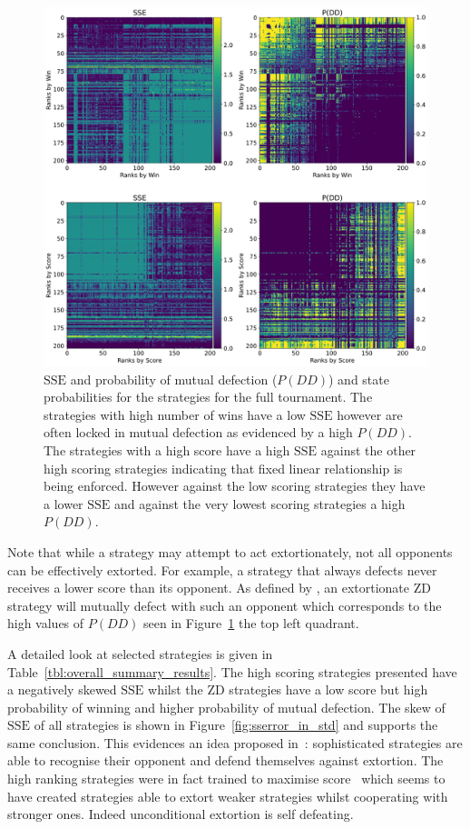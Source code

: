 \documentclass[a4paper]{article}
\newcommand{\SSe}{\text{SSE}}
\begin{document}
\begin{figure}[!htbp]
    \centering
    \includegraphics[width=.95\textwidth]{./assets/img/sse_chi_probabilities_in_full/main.pdf}
    \caption{\(\SSe\) and probability of mutual defection (\(P(DD)\)) and state probabilities for the strategies for
        the full tournament. The strategies with high number of wins
        have a low \(\SSe\) however are often locked in mutual defection as
        evidenced by a high \(P(DD)\). The strategies with a high score
        have a high \(\SSe\) against the other high scoring strategies
        indicating that fixed linear relationship is being enforced. However
        against the low scoring strategies they have a lower \(\SSe\) and
        against the very lowest scoring strategies a high \(P(DD)\).}
    \label{fig:sse_chi_probabilities_in_full}
\end{figure}

Note that while a strategy may attempt to act extortionately, not all opponents
can be effectively extorted. For example, a strategy that always defects never
receives a lower score than its opponent. As defined by \cite{Press2012}, an
extortionate ZD strategy will mutually defect with such an opponent which
corresponds to the high values of \(P(DD)\) seen in
Figure~\ref{fig:sse_chi_probabilities_in_full} the top left quadrant.

A detailed look at selected strategies is given in
Table~\ref{tbl:overall_summary_results}. The high scoring strategies presented
have a negatively skewed \(\SSe\) whilst the ZD strategies have a low score but
high probability of winning and higher probability of mutual defection.
The skew of \(\SSe\) of all strategies is shown in
Figure~\ref{fig:sserror_in_std} and supports the
same conclusion. This evidences an idea proposed
in~\cite{adami2013evolutionary}: sophisticated strategies are able to recognise
their opponent and defend themselves against extortion.  The high ranking
strategies were in fact trained to maximise score~\cite{Harper2017} which seems
to have created strategies able to extort weaker strategies whilst cooperating
with stronger ones. Indeed unconditional extortion is self defeating.
\end{document}
